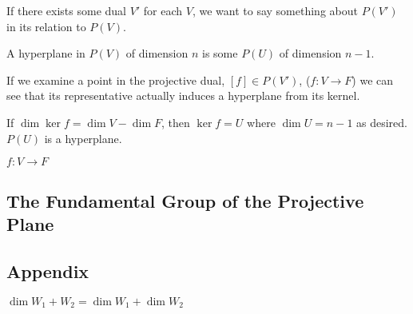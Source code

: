 \documentclass[10pt]{article}
\begin{document}
\begin{note}
If there exists some dual $V'$ for each $V$, we want to say something about
$P(V')$ in its relation to $P(V)$.

\begin{definition}
	A hyperplane in $P(V)$ of dimension $n$ is some $P(U)$ of dimension $n-1$.
\end{definition}

If we examine a point in the projective dual, $[f] \in P(V')$, ($f: V \to F$) we can see that
its representative actually induces a hyperplane from its kernel.

If $\dim \ker f = \dim V - \dim F$, then $\ker f = U$ where $\dim U = n-1$ as
desired. $P(U)$ is a hyperplane. 


$f: V \to F$

\end{note}

\subsection{The Fundamental Group of the Projective Plane}

\subsection{Appendix}

\begin{theorem}
	$\dim W_1 + W_2 = \dim W_1 + \dim W_2$
\end{theorem}
\end{document}
